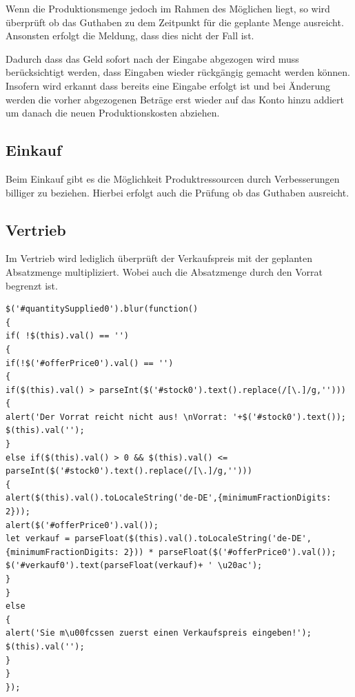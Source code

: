 Wenn die Produktionsmenge jedoch im Rahmen des Möglichen liegt, so wird überprüft ob das Guthaben zu dem Zeitpunkt für die geplante Menge ausreicht. Ansonsten erfolgt die Meldung, dass dies nicht der Fall ist. 

Dadurch dass das Geld sofort nach der Eingabe abgezogen wird muss berücksichtigt werden, dass Eingaben wieder rückgängig gemacht werden können. Insofern wird erkannt dass bereits eine Eingabe erfolgt ist und bei Änderung werden die vorher abgezogenen Beträge erst wieder auf das Konto hinzu addiert um danach die neuen Produktionskosten abziehen.

\subsection*{Einkauf}

Beim Einkauf gibt es die Möglichkeit Produktressourcen durch Verbesserungen billiger zu beziehen. Hierbei erfolgt auch die Prüfung ob das Guthaben ausreicht.


\subsection*{Vertrieb}

Im Vertrieb wird lediglich überprüft der Verkaufspreis mit der geplanten Absatzmenge multipliziert. Wobei auch die Absatzmenge durch den Vorrat begrenzt ist.

\lstset{language=Java}
\begin{lstlisting}
$('#quantitySupplied0').blur(function()
{
if( !$(this).val() == '')
{
if(!$('#offerPrice0').val() == '')
{
if($(this).val() > parseInt($('#stock0').text().replace(/[\.]/g,'')))
{
alert('Der Vorrat reicht nicht aus! \nVorrat: '+$('#stock0').text());
$(this).val('');
}
else if($(this).val() > 0 && $(this).val() <= parseInt($('#stock0').text().replace(/[\.]/g,'')))
{
alert($(this).val().toLocaleString('de-DE',{minimumFractionDigits: 2}));
alert($('#offerPrice0').val());
let verkauf = parseFloat($(this).val().toLocaleString('de-DE',{minimumFractionDigits: 2})) * parseFloat($('#offerPrice0').val());
$('#verkauf0').text(parseFloat(verkauf)+ ' \u20ac');
}
}
else
{
alert('Sie m\u00fcssen zuerst einen Verkaufspreis eingeben!');
$(this).val('');
}
}
});
\end{lstlisting}
















